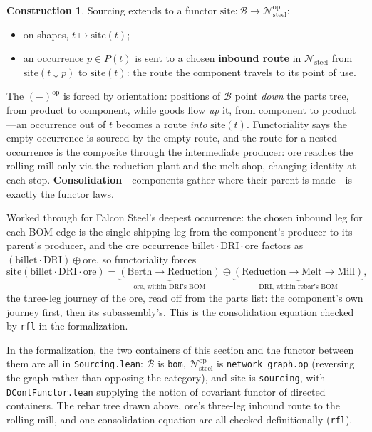 \documentclass[11pt,a4paper]{article}
\newcommand{\N}{\mathcal{N}}
\newcommand{\B}{\mathcal{B}}
\newcommand{\dc}{\mathbin{\downarrow}}
\newcommand{\site}{\mathrm{site}}
\theoremstyle{plain}
\theoremstyle{definition}
\newtheorem{construction}[theorem]{Construction}
\theoremstyle{remark}
\begin{document}
\begin{construction}\label{con:sourcing}
Sourcing extends to a functor
$\site : \B \to \N_{\mathrm{steel}}^{\mathrm{op}}$:
\begin{itemize}[nosep]
\item on shapes, $t \mapsto \site(t)$;
\item an occurrence $p \in P(t)$ is sent to a chosen \textbf{inbound
  route} in $\N_{\mathrm{steel}}$ from $\site(t \dc p)$ to
  $\site(t)$: the route the component travels to its point of use.
\end{itemize}
The $(-)^{\mathrm{op}}$ is forced by orientation: positions of $\B$
point \emph{down} the parts tree, from product to component, while
goods flow \emph{up} it, from component to product---an occurrence
out of $t$ becomes a route \emph{into} $\site(t)$. Functoriality
says the empty occurrence is sourced by the empty route, and the
route for a nested occurrence is the composite through the
intermediate producer: ore reaches the rolling mill only via the
reduction plant and the melt shop, changing identity at each stop.
\textbf{Consolidation}---components gather where their parent is
made---is exactly the functor laws.
\end{construction}

Worked through for Falcon Steel's deepest occurrence: the chosen
inbound leg for each BOM edge is the single shipping leg from the
component's producer to its parent's producer, and the ore
occurrence $\text{billet}\cdot\text{DRI}\cdot\text{ore}$ factors as
$(\text{billet}\cdot\text{DRI}) \oplus \text{ore}$, so
functoriality forces
\[
\site(\text{billet}\cdot\text{DRI}\cdot\text{ore})
=
\underbrace{(\text{Berth} \to \text{Reduction})}_{\text{ore, within DRI's BOM}}
\oplus
\underbrace{(\text{Reduction} \to \text{Melt} \to \text{Mill})}_{\text{DRI, within rebar's BOM}},
\]
the three-leg journey of the ore, read off from the parts list: the
component's own journey first, then its subassembly's. This is the
consolidation equation checked by \texttt{rfl} in the
formalization.

In the formalization, the two containers of this section and the
functor between them are all in \texttt{Sourcing.lean}: $\B$ is
\texttt{bom}, $\N_{\mathrm{steel}}^{\mathrm{op}}$ is
\texttt{network graph.op} (reversing the graph rather than opposing
the category), and $\site$ is \texttt{sourcing}, with
\texttt{DContFunctor.lean} supplying the notion of covariant functor
of directed containers. The rebar tree drawn above, ore's three-leg
inbound route to the rolling mill, and one consolidation equation
are all checked definitionally (\texttt{rfl}).
\end{document}
